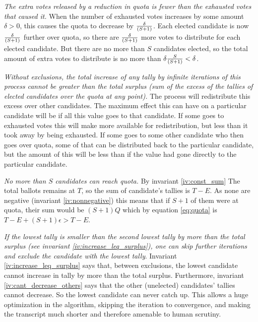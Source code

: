 \documentclass{article}
\begin{document}
\begin{invariant}\label{iv:exhausted_not_loophole}
    \emph{The extra votes released by a reduction in quota is fewer than the exhausted votes that caused it.} When the number of exhausted votes increases by some amount
    $\delta>0$, this causes the quota to decrease by $\delta\over{(S+1)}$. Each elected
    candidate is now $\delta\over{(S+1)}$ further over quota, so there are 
    $\delta\over{(S+1)}$ more votes to distribute for each elected candidate. But
    there are no more than $S$ candidates elected, so the total amount of extra votes
    to distribute is no more than $\delta{S\over{(S+1)}}<\delta$.
\end{invariant}   

\begin{invariant}\label{iv:increase_leq_surplus}
    \emph{Without exclusions, the total increase of any tally by infinite iterations of this process cannot be greater than the total surplus (sum of the excess of the tallies of elected candidates over the quota at any point).} The process will redistribute this excess over other candidates. The
    maximum effect this can have on a particular candidate will be if all this value
    goes to that candidate. If some goes to exhausted votes this will make more available
    for redistribution, but less than it took away by being exhausted. If some goes to
    some other candidate who then goes over quota, some of that can be distributed
    back to the particular candidate, but the amount of this will be less than if
    the value had gone directly to the particular candidate.
\end{invariant}   

\begin{invariant}\label{iv:dont_elect_too_many}
    \emph{No more than $S$ candidates can reach quota.} By invariant \ref{iv:const_sum} The
    total ballots remains at $T$, so the sum of candidate's tallies is $T-E$. As none
    are negative (invariant \ref{iv:nonnegative}) this means that if $S+1$ of them were at
    quota, their sum would be $(S+1)Q$ which by equation \ref{eq:quota} is $T-E+(S+1)\epsilon>T-E$.
\end{invariant}   

\begin{invariant}\label{iv:lowest_doomed}
    \emph{If the lowest tally is smaller than the second lowest tally by more than
    the total surplus (see invariant \ref{iv:increase_leq_surplus}), one can skip
    further iterations and exclude the candidate with the lowest tally}. 
    Invariant \ref{iv:increase_leq_surplus} says that, between exclusions, 
    the lowest candidate cannot increase in tally by more than the total surplus.
    Furthermore, invariant \ref{iv:cant_decrease_others} 
    says that the other (unelected) candidates' tallies cannot decrease. So
    the lowest candidate can never catch up. This allows a huge optimization in
    the algorithm, skipping the iteration to convergence, and making the transcript
    much shorter and therefore amenable to human scrutiny.
\end{invariant}
\end{document}
